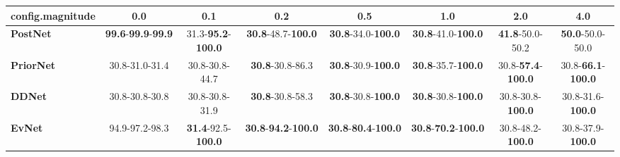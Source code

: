 \begin{tabular}{lccccccc}
\toprule
\textbf{config.magnitude} &                                        0.0 &                                0.1 &                                         0.2 &                                         0.5 &                                         1.0 &                                2.0 &                                4.0 \\
\midrule
\textbf{PostNet } &  \textbf{99.6}-\textbf{99.9}-\textbf{99.9} &  31.3-\textbf{95.2}-\textbf{100.0} &           \textbf{30.8}-48.7-\textbf{100.0} &           \textbf{30.8}-34.0-\textbf{100.0} &           \textbf{30.8}-41.0-\textbf{100.0} &            \textbf{41.8}-50.0-50.2 &            \textbf{50.0}-50.0-50.0 \\
\textbf{PriorNet} &                             30.8-31.0-31.4 &                     30.8-30.8-44.7 &                     \textbf{30.8}-30.8-86.3 &           \textbf{30.8}-30.9-\textbf{100.0} &           \textbf{30.8}-35.7-\textbf{100.0} &  30.8-\textbf{57.4}-\textbf{100.0} &  30.8-\textbf{66.1}-\textbf{100.0} \\
\textbf{DDNet   } &                             30.8-30.8-30.8 &                     30.8-30.8-31.9 &                     \textbf{30.8}-30.8-58.3 &           \textbf{30.8}-30.8-\textbf{100.0} &           \textbf{30.8}-30.8-\textbf{100.0} &           30.8-30.8-\textbf{100.0} &           30.8-31.6-\textbf{100.0} \\
\textbf{EvNet   } &                             94.9-97.2-98.3 &  \textbf{31.4}-92.5-\textbf{100.0} &  \textbf{30.8}-\textbf{94.2}-\textbf{100.0} &  \textbf{30.8}-\textbf{80.4}-\textbf{100.0} &  \textbf{30.8}-\textbf{70.2}-\textbf{100.0} &           30.8-48.2-\textbf{100.0} &           30.8-37.9-\textbf{100.0} \\
\bottomrule
\end{tabular}
